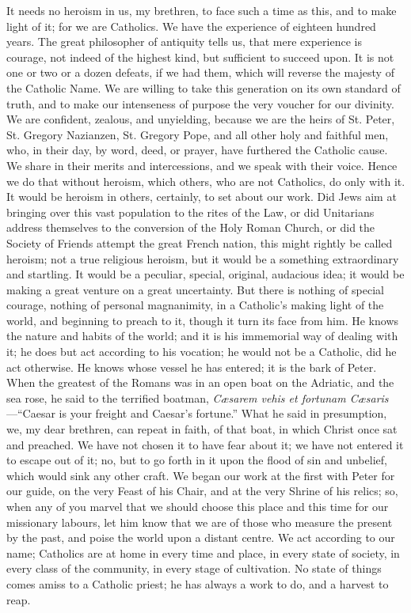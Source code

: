 It needs no heroism in us, my brethren, to face such a time as
this, and to make light of it; for we are Catholics. We have the
experience of eighteen hundred years. The great philosopher of
antiquity tells us, that mere experience is courage, not indeed of the
highest kind, but sufficient to succeed upon. It is not one or two or
a dozen defeats, if we had them, which will reverse the majesty of the
Catholic Name. We are willing to take this generation on its own
standard of truth, and to make our intenseness of purpose the very
voucher for our divinity. We are confident, zealous, and unyielding,
because we are the heirs of St. Peter, St. Gregory Nazianzen, St.
Gregory Pope, and all other holy and faithful men, who, in their day,
by word, deed, or prayer, have furthered the Catholic cause. We share
in their merits and intercessions, and we speak with their voice.
Hence we do that without heroism, which others, who are not Catholics,
do only with it. It would be heroism in others, certainly, to set
about our work. Did Jews aim at bringing over this vast population to
the rites of the Law, or did Unitarians address themselves to the
conversion of the Holy Roman Church, or did the Society of Friends
attempt the great French nation, this might rightly be called heroism;
not a true religious heroism, but it would be a something
extraordinary and startling. It would be a peculiar, special,
original, audacious idea; it would be making a great venture on a
great uncertainty. But there is nothing of special courage, nothing of
personal magnanimity, in a Catholic's making light of the world, and
beginning to preach to it, though it turn its face from him. He knows
the nature and habits of the world; and it is his immemorial way of
dealing with it; he does but act according to his vocation; he would
not be a Catholic, did he act otherwise. He knows whose vessel he has
entered; it is the bark of Peter. When the greatest of the Romans was
in an open boat on the Adriatic, and the sea rose, he said to the
terrified boatman, \emph{Cæsarem vehis et fortunam Cæsaris}—``Caesar
is your freight and Caesar's fortune.'' What he said in
presumption, we, my dear brethren, can repeat in faith, of that boat,
in which Christ once sat and preached. We have not chosen it to have
fear about it; we have not entered it to escape out of it; no, but to
go forth in it upon the flood of sin and unbelief, which would sink
any other craft. We began our work at the first with Peter for our
guide, on the very Feast of his Chair, and at the very Shrine of his
relics; so, when any of you marvel that we should choose this place
and this time for our missionary labours, let him know that we are of
those who measure the present by the past, and poise the world upon a
distant centre. We act according to our name; Catholics are at home in
every time and place, in every state of society, in every class of the
community, in every stage of cultivation. No state of things comes
amiss to a Catholic priest; he has always a work to do, and a harvest
to reap.

